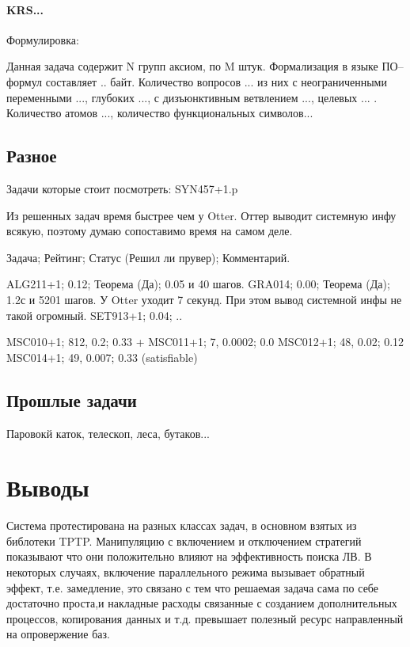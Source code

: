 \paragraph{KRS...}
Формулировка:

Данная задача содержит N групп аксиом, по M штук. Формализация в языке ПО--формул составляет .. байт. Количество вопросов ... из них с неограниченными переменными ..., глубоких ..., с дизъюнктивным ветвлением ..., целевых ... . Количество атомов ..., количество функциональных символов... 


\subsection{Разное}
Задачи которые стоит посмотреть:
SYN457+1.p

Из решенных задач время быстрее чем у Otter. Оттер выводит системную инфу всякую, поэтому думаю сопоставимо время на самом деле.

Задача; Рейтинг; Статус (Решил ли прувер); Комментарий.

ALG211+1; 0.12; Теорема (Да); 0.05 и 40 шагов.
GRA014; 0.00; Теорема (Да); 1.2с и 5201 шагов. У Otter уходит 7 секунд. При этом вывод системной инфы не такой огромный.
SET913+1; 0.04; ..


MSC010+1; 812, 0.2; 0.33 +
MSC011+1; 7, 0.0002; 0.0 
MSC012+1; 48, 0.02; 0.12
MSC014+1; 49, 0.007; 0.33 (satisfiable)




\subsection{Прошлые задачи}

Паровокй каток, телескоп, леса, бутаков...


\section{Выводы}
Система протестирована на разных классах задач, в основном взятых из библотеки TPTP. Манипуляцию с включением и отключением стратегий показывают что они положительно влияют на эффективность поиска ЛВ. В некоторых случаях, включение параллельного режима вызывает обратный эффект, т.е. замедление, это связано с тем что решаемая задача сама по себе достаточно проста,и  накладные расходы связанные с созданием дополнительных процессов, копирования данных и т.д. превышает полезный ресурс направленный на опровержение баз. 

